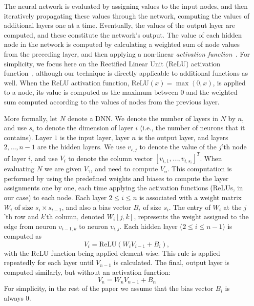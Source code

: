 \documentclass{easychair}
\newcommand{\relu}{\text{ReLU}\xspace{}}
\newcommand{\ben}[1]{\marginpar{\textcolor{blue}{Ben: #1}}}
\begin{document}
The neural network is evaluated by assigning values to the input
nodes, and then iteratively propagating these values through the
network, computing the values of additional layers one at a
time. Eventually, the values of the output layer are computed, and
these constitute the network's output.  The value of each hidden node
in the network is computed by calculating a weighted sum of node
values from the preceding layer, and then applying a non-linear
\emph{activation function}~\cite{FoBeCu16}.  For simplicity, we focus
here on the Rectified Linear Unit (ReLU) activation
function~\cite{NaHi10}, although our technique is directly applicable
to additional functions as well.  When the ReLU activation function,
$\relu{}(x) = \max{}(0, x)$, is applied to a node, its value is
computed as the maximum between $0$ and the weighted sum computed
according to the values of nodes from
the previous layer.

More formally, let $N$ denote a DNN. We
denote the number of layers in $N$ by $n$, and use $s_i$ to denote the
dimension of layer $i$ (i.e., the number of neurons that it contains).
Layer $1$ is the input layer, layer $n$ is the output layer, and
layers $2,\ldots,n-1$ are the hidden layers.
We use $v_{i,j}$  to denote the value of the $j$'th node of layer $i$,
and use $V_i$ to denote the column vector $[v_{i,1},\ldots,v_{i,s_i}]^T$.
When evaluating $N$ we are given $V_1$, and need to compute $V_n$.
This computation is 
performed by using the predefined weights and biases to compute the
layer assignments one by one, each time applying the activation
functions (ReLUs, in our case) to each node. Each layer $2\leq i\leq
n$
is associated
with a 
weight matrix $W_i$ of size $s_{i}\times s_{i-1}$, and also a bias vector $B_i$ of size
$s_i$. The entry of $W_i$ at the $j$'th row and $k$'th column, denoted
$W_i[j,k]$, represents the weight assigned to the edge from
neuron $v_{i-1,k}$ to neuron $v_{i,j}$.
Each hidden layer ($2\leq i \leq n-1$) 
is computed as
\[
V_i = \relu{}(W_i  V_{i-1} + B_i),
\]
with the ReLU
function being applied element-wise.
This rule is applied repeatedly for each layer until $V_{n-1}$ is
calculated.
The final, output layer is
computed similarly, but without an activation function:
\[
  V_n = W_n  V_{n-1} + B_n
\]
For simplicity, in the rest of the paper we assume that \ben{is this assumption correct? we biases in the toy example}
the bias vector $B_i$ is always $0$.
\end{document}
